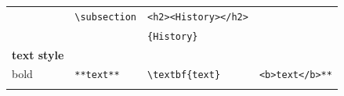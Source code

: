 \documentclass[10pt,fleqn]{wlpeerj}
\begin{document}
\begin{longtable}[]{@{}llll@{}}
&
\begin{minipage}[t]{0.25\columnwidth}\raggedright\strut
\texttt{\textbackslash{}subsection}
\strut\end{minipage}
&
\begin{minipage}[t]{0.27\columnwidth}\raggedright\strut
\texttt{\textless{}h2\textgreater{}\textless{}History\textgreater{}\textless{}/h2\textgreater{}}
\strut\end{minipage}\tabularnewline
\begin{minipage}[t]{0.20\columnwidth}\raggedright\strut
\strut\end{minipage}
&
\begin{minipage}[t]{0.17\columnwidth}\raggedright\strut
\strut\end{minipage}
&
\begin{minipage}[t]{0.25\columnwidth}\raggedright\strut
\texttt{\{History\}}
\strut\end{minipage}
&
\begin{minipage}[t]{0.27\columnwidth}\raggedright\strut
\strut\end{minipage}\tabularnewline
\begin{minipage}[t]{0.20\columnwidth}\raggedright\strut
\textbf{text
style}
\strut\end{minipage}
&
\begin{minipage}[t]{0.17\columnwidth}\raggedright\strut
\strut\end{minipage}
&
\begin{minipage}[t]{0.25\columnwidth}\raggedright\strut
\strut\end{minipage}
&
\begin{minipage}[t]{0.27\columnwidth}\raggedright\strut
\strut\end{minipage}\tabularnewline
\begin{minipage}[t]{0.20\columnwidth}\raggedright\strut
bold
\strut\end{minipage}
&
\begin{minipage}[t]{0.17\columnwidth}\raggedright\strut
\texttt{**text**}
\strut\end{minipage}
&
\begin{minipage}[t]{0.25\columnwidth}\raggedright\strut
\texttt{\textbackslash{}textbf\{text\}}
\strut\end{minipage}
&
\begin{minipage}[t]{0.27\columnwidth}\raggedright\strut
\texttt{\textless{}b\textgreater{}text\textless{}/b\textgreater{}**}
\strut\end{minipage}\tabularnewline
\begin{minipage}[t]{0.20\columnwidth}\raggedright\strut

\end{minipage}
\end{longtable}
\end{document}
